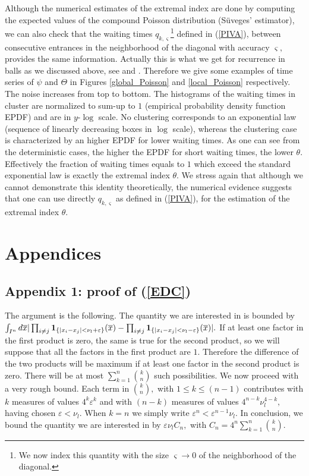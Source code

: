 \documentclass[12pt,reqno,a4paper]{amsart}
\def\eps{\varepsilon}
\def\ox{\overline{x}}
\def\eps {\varepsilon}
\begin{document}
Although the numerical estimates of the extremal index are done by computing the expected values of the compound Poisson distribution (S\"uveges' estimator), we can also check that the waiting times $q_{k,\varsigma}$\footnote{We now index this quantity with the size $\varsigma \rightarrow 0$ of the neighborhood of the diagonal.}  defined in (\ref{PIVA}),  between consecutive entrances in the neighborhood of the diagonal with accuracy $\varsigma,$  provides the same information. Actually this is what we get for recurrence in balls as we discussed above, see \cite{HV} and \cite{AJFM3}.   Therefore we give some examples of time series of  $\psi$ and $\Theta$ in Figures \ref{global_Poisson} and \ref{local_Poisson} respectively. The noise increases from top to bottom. The histograms of the waiting times in cluster are normalized to sum-up to $1$ (empirical probability density function EPDF) and are in $y$-$\log$ scale. No clustering corresponds to  an exponential law (sequence of linearly decreasing boxes in $\log$ scale), whereas the clustering case is characterized by an higher EPDF for lower waiting times. As one can see from the deterministic cases, the higher the EPDF for short waiting times, the lower $\theta$. Effectively the fraction of waiting times equals to $1$ which exceed the standard exponential law is exactly the extremal index  $\theta$. We stress again that although we cannot demonstrate this identity theoretically, the numerical evidence suggests that one can use directly $q_{k,\varsigma}$ as defined in (\ref{PIVA}),  for the estimation of the extremal index $\theta$.\\
\section {Appendices}
\subsection{Appendix 1: proof of (\ref{EDC})}
The argument is the following. The quantity we are interested in is bounded by $\int_{I^n}d\ox |\prod_{i\neq j}{\bf 1}_{\{|x_i-x_j|<\nu_l+\eps\}}(\ox)-\prod_{i\neq j}{\bf 1}_{\{|x_i-x_j|<\nu_l-\eps\}}(\ox)|.$ If at least one factor in  the first  product is zero, the same is true for the second product, so we will suppose that all the factors in the first product are $1$. Therefore the difference of the two products will be maximum if at least one factor in the second product is zero. There will be at most $\sum_{k=1}^n \binom{k}{n}$ such possibilities. We now proceed with a very rough bound. Each term in $\binom{k}{n},$ with $1\le k\le (n-1)$ contributes with $k$ measures of values $4^k\eps^k$ and with $(n-k)$ measures of values $4^{n-k}\nu_l^{4-k},$ having chosen $\eps<\nu_l$. When $k=n$ we simply write $\eps^n<\eps^{n-1}\nu_l.$ In conclusion, we bound the quantity we are interested in by $\eps \nu_l C_n,$ with $C_n=4^n\sum_{k=1}^n  \binom{k}{n}.$
\end{document}
